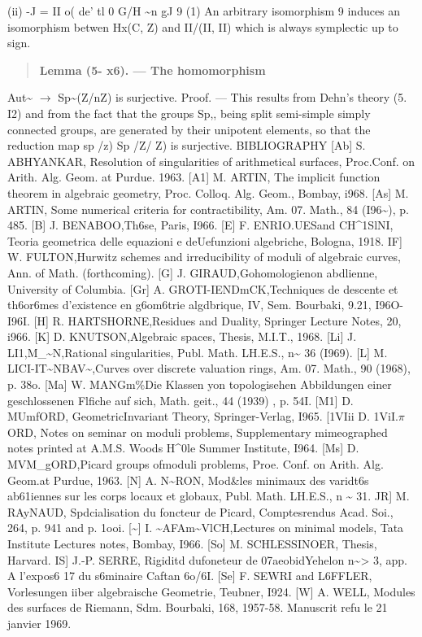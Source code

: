 \documentclass[11pt]{article}
\theoremstyle{plain}
\theoremstyle{definition}
\theoremstyle{remark}
\begin{document}
(ii) -J = II o( de' tl 0 G/H \textasciitilde{}n gJ 9 (1) An arbitrary isomorphism 9 induces an isomorphism betwen Hx(C, Z) and II/(II, II) which is always symplectic up to sign.

\begin{quote}\textbf{Lemma (5- x6). --- The homomorphism}\end{quote}
Aut\textasciitilde{} $\to$ Sp\textasciitilde{}(Z/nZ) is surjective. Proof. --- This results from Dehn's theory (5. I2) and from the fact that the groups Sp,, being split semi-simple simply connected groups, are generated by their unipotent elements, so that the reduction map sp /z) Sp /Z/ Z) is surjective. BIBLIOGRAPHY [Ab] S. ABHYANKAR, Resolution of singularities of arithmetical surfaces, Proc.Conf. on Arith. Alg. Geom. at Purdue. 1963. [A1] M. ARTIN, The implicit function theorem in algebraic geometry, Proc. Colloq. Alg. Geom., Bombay, i968. [As] M. ARTIN, Some numerical criteria for contractibility, Am. 07. Math., 84 (I96\textasciitilde{}), p. 485. [B] J. BENABOO,Th6se, Paris, I966. [E] F. ENRIO.UESand CH\textasciicircum{}1SlNI, Teoria geometrica delle equazioni e deUefunzioni algebriche, Bologna, 1918. IF] W. FULTON,Hurwitz schemes and irreducibility of moduli of algebraic curves, Ann. of Math. (forthcoming). [G] J. GIRAUD,Gohomologienon abdlienne, University of Columbia. [Gr] A. GROTI-IENDmCK,Techniques de descente et th6or6mes d'existence en g6om6trie algdbrique, IV, Sem. Bourbaki, 9.21, I96O-I96I. [H] R. HARTSHORNE,Residues and Duality, Springer Lecture Notes, 20, i966. [K] D. KNUTSON,Algebraic spaces, Thesis, M.I.T., 1968. [Li] J. LI1,M\_\textasciitilde{}N,Rational singularities, Publ. Math. LH.E.S., n\textasciitilde{} 36 (I969). [L] M. LICI-IT\textasciitilde{}NBAV\textasciitilde{},Curves over discrete valuation rings, Am. 07. Math., 90 (1968), p. 38o. [Ma] W. MANGm\%Die Klassen yon topologisehen Abbildungen einer geschlossenen Flfiche auf sich, Math. geit., 44 (1939) , p. 54I. [M1] D. MUmfORD, GeometricInvariant Theory, Springer-Verlag, I965. [1VIii D. 1ViI.$\pi$ORD, Notes on seminar on moduli problems, Supplementary mimeographed notes printed at A.M.S. Woods H\textasciicircum{}0le Summer Institute, I964. [Ms] D. MVM\_gORD,Picard groups ofmoduli problems, Proe. Conf. on Arith. Alg. Geom.at Purdue, 1963. [N] A. N\textasciitilde{}RON, Mod\&les minimaux des varidt6s ab61iennes sur les corps locaux et globaux, Publ. Math. LH.E.S., n \textasciitilde{} 31. JR] M. RAyNAUD, Spdcialisation du foncteur de Picard, Comptesrendus Acad. Soi., 264, p. 941 and p. 1ooi. [\textasciitilde{}] I. \textasciitilde{}AFAm\textasciitilde{}VlCH,Lectures on minimal models, Tata Institute Lectures notes, Bombay, I966. [So] M. SCHLESSINOER, Thesis, Harvard. IS] J.-P. SERRE, Rigiditd dufoneteur de 07aeobidYehelon n\textasciitilde{}> 3, app. A l'expos6 17 du s6minaire Caftan 6o/6I. [Se] F. SEWRI and L6FFLER, Vorlesungen iiber algebraische Geometrie, Teubner, I924. [W] A. WELL, Modules des surfaces de Riemann, Sdm. Bourbaki, 168, 1957-58. Manuscrit refu le 21 janvier 1969.
\end{document}
